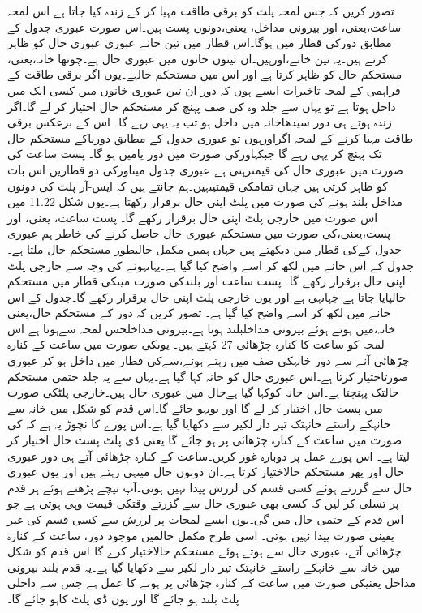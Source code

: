 	تصور کریں کہ جس لمحہ پلٹ کو برقی طاقت مہیا کر کے زندہ کیا جاتا ہے  اس لمحہ  ساعت،یعنی، اور بیرونی مداخل، یعنی،دونوں پست ہیں۔اس صورت عبوری جدول کے مطابق دورکی قطار میں ہوگا۔اس قطار میں تین خانے عبوری عبوری حال  کو ظاہر کرتے ہیں۔یہ تین خانے،اورہیں۔ان تینوں خانوں میں عبوری حال ہے۔چوتھا خانہ،یعنی، مستحکم حال کو ظاہر کرتا ہے اور اس میں مستحکم حالہے۔یوں اگر برقی طاقت کے فراہمی کے لمحہ تاخیرات ایسے ہوں کہ دور ان تین عبوری خانوں میں کسی ایک میں داخل ہوتا ہے تو یہاں سے جلد وہ کی صف پہنچ کر مستحکم حال اختیار کر لے گا۔اگر زندہ ہوتے ہی دور سیدھاخانہ میں داخل ہو تب یہ یہی رہے گا۔
	اس کے برعکس برقی طاقت مہیا کرنے کے لمحہ اگراورہوں تو عبوری جدول کے مطابق دوریاکے مستحکم حال تک پہنچ کر یہی رہے گا جبکہاورکی صورت میں دور یامیں ہو گا۔
	پست ساعت کی صورت میں عبوری حال کی قیمترہتی ہے۔عبوری جدول میںاورکی دو قطاریں اس بات کو ظاہر کرتی ہیں جہاں تمامکی قیمتیںہیں۔ہم جانتے ہیں کہ ایس-آر پلٹ کی دونوں مداخل بلند ہونے کی صورت میں پلٹ اپنی حال برقرار رکھتا ہے۔یوں شکل 11.22 میں اس صورت میں خارجی پلٹ اپنی حال برقرار رکھے گا۔
	پست ساعت، یعنی، اور پست،یعنی،کی صورت میں مستحکم عبوری حال  حاصل کرنے کی خاطر ہم عبوری جدول کےکی قطار میں دیکھتے ہیں جہاں ہمیں مکمل حالبطور مستحکم حال ملتا ہے۔جدول کے اس خانے میں لکھ کر اسے واضح کیا گیا ہے۔یہاںہونے کی وجہ سے خارجی پلٹ اپنی حال برقرار رکھے گا۔
	پست ساعت اور بلندکی صورت میںکی قطار میں مستحکم حالپایا جاتا ہے جہاںہی ہے اور یوں خارجی پلٹ اپنی حال برقرار رکھے گا۔جدول کے اس خانے میں لکھ کر اسے واضح کیا گیا ہے۔
	تصور کریں کہ دور کے مستحکم حال،یعنی خانہ،میں ہوتے ہوئے بیرونی مداخلبلند ہوتا ہے۔بیرونی مداخلجس لمحہ سےہوتا ہے اس لمحہ کو ساعت کا کنارہ چڑھائی 27 کہتے ہیں۔ یوںکی صورت میں ساعت کے کنارہ چڑھائی آنے سے دور خانہکی صف میں رہتے ہوئے،سےکی قطار میں داخل ہو کر عبوری صورتاختیار کرتا ہے۔اس عبوری حال  کو خانہ کہا گیا ہے۔یہاں سے یہ جلد حتمی مستحکم حالتک پہنچتا ہے۔اس خانہ کوکہا گیا ہےحال میں عبوری حال  ہیں۔خارجی پلٹکی صورت میں پست حال اختیار کر لے گا اور یوںہو جائے گا۔اس قدم کو شکل میں خانہ سے  خانہکے راستے خانہتک تیر دار  لکیر سے دکھایا گیا ہے۔اس پورے کا نچوڑ یہ ہے کہ کی صورت میں ساعت کے کنارہ چڑھائی پر ہو جائے گا یعنی ڈی پلٹ پست حال اختیار کر لیتا ہے۔
	اس پورے عمل پر دوبارہ غور کریں۔ساعت کے کنارہ چڑھائی آتے ہی دور عبوری حال اور پھر مستحکم حالاختیار کرتا ہے۔ان دونوں حال میںہی رہتے ہیں اور یوں عبوری حال  سے گزرتے ہوئے کسی قسم کی لرزش پیدا نہیں ہوتی۔آپ نیچے پڑھتے ہوئے ہر قدم پر تسلی کر لیں کہ کسی بھی عبوری حال  سے گزرتے وقتکی قیمت وہی ہوتی ہے جو اس قدم کے حتمی حال میں گی۔یوں ایسے لمحات پر لرزش سے کسی قسم کی غیر یقینی صورت پیدا نہیں ہوتی۔
		اسی طرح مکمل حالمیں موجود دور، ساعت کے کنارہ چڑھائی آتے، عبوری حال سے ہوتے ہوئے مستحکم حالاختیار کرے گا۔اس قدم کو شکل میں خانہ سے  خانہکے راستے خانہتک تیر دار  لکیر سے دکھایا گیا ہے۔یہ قدم بلند بیرونی مداخل یعنیکی صورت میں ساعت کے کنارہ چڑھائی پر ہونے کا عمل ہے جس سے داخلی پلٹ بلند ہو جائے گا اور یوں ڈی پلٹ کاہو جائے گا۔
